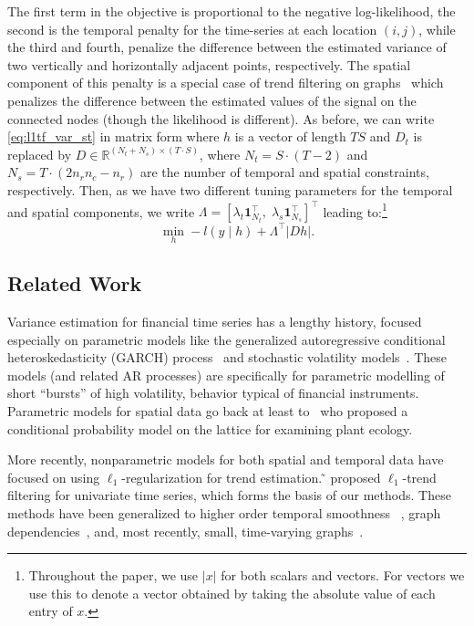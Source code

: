 \documentclass[letterpaper]{article} %
\newcommand{\citet}[1]
{\citeauthor{#1} ̃\shortcite{#1}}
\newcommand{\one}{\mathbf{1}}
\newcommand{\given}{\;\vert\;}
\begin{document}
The first term in the objective is proportional to the negative
log-likelihood, the second is the temporal penalty for the
time-series at each location $(i,j)$, while the third and fourth,
penalize the difference between the estimated variance of two
vertically and horizontally adjacent points, respectively. The spatial
component of this
penalty is a special case of trend filtering on
graphs~\cite{WangSharpnack2016} which penalizes the difference between
the estimated values of the signal on the connected nodes (though the
likelihood is different). As before,
we can write \eqref{eq:l1tf_var_st} in matrix form where $h$ is a
vector of length
$TS$ and $D_t$ is replaced by $D \in
\mathbb{R}^{(N_t+N_s) \times (T \cdot S)	}$, where $N_t=S \cdot
(T-2)$ and $N_s=T \cdot (2n_rn_c-n_r)$ are the number of temporal and
spatial constraints, respectively. 
Then, as we have two different tuning parameters
for the temporal and spatial components, we write $\Lambda
=\left[\lambda_t\one_{N_t}^\top,\;
  \lambda_s\one_{N_s}^\top\right]^\top$ leading
to:\footnote{Throughout the paper, we use $|x|$ for both scalars and
  vectors. For vectors we use this to denote a vector obtained by
  taking the absolute value of each entry of $x$.}  
\begin{equation}
\min_h -l(y\given h)+ \Lambda^\top | Dh |.
\label{eq:l1tf_var_st_mat}
\end{equation}

\subsection{Related Work}

Variance estimation for financial time series has a lengthy history,
focused especially on parametric models like the generalized
autoregressive conditional heteroskedasticity (GARCH) process~\cite{engle2002dynamic} and
stochastic volatility models~\cite{HarveyRuiz1994}. These models (and
related AR processes) are specifically for parametric modelling of
short ``bursts'' of high volatility, behavior typical of financial
instruments. Parametric models for spatial data go back at least
to~\cite{besag1974spatial} who proposed a conditional probability
model on the lattice for examining plant ecology.

More recently, nonparametric models for both spatial and temporal data
have focused on using $\ell_1$-regularization for trend
estimation. \citet{KimKoh2009} proposed $\ell_1$-trend filtering for
univariate time series, which forms the basis of our methods. These
methods have been generalized to higher order temporal smoothness
~\cite{Tibshirani2014}, graph dependencies~\cite{WangSharpnack2016},
and, most recently, small, time-varying
graphs~\cite{HallacPark2017}. 
\end{document}
